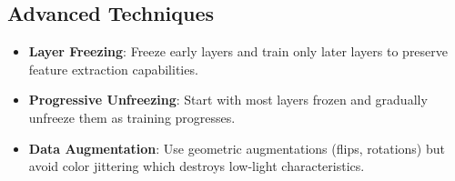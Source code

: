 \documentclass[12pt, a4paper]{report}
\begin{document}
\subsection{Advanced Techniques}
\begin{itemize}
    \item \textbf{Layer Freezing}: Freeze early layers and train only later layers to preserve feature extraction capabilities.
    \item \textbf{Progressive Unfreezing}: Start with most layers frozen and gradually unfreeze them as training progresses.
    \item \textbf{Data Augmentation}: Use geometric augmentations (flips, rotations) but avoid color jittering which destroys low-light characteristics.
\end{itemize}
\end{document}
